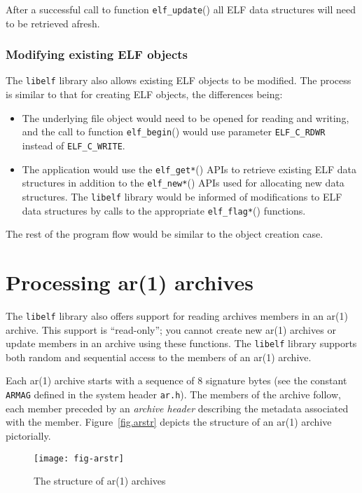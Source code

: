 \documentclass[a4paper]{book}
\newcommand{\constant}[1]{\texttt{#1}}
\newcommand{\function}[1]{\texttt{#1}()}
\newcommand{\filename}[1]{\texttt{#1}}
\newcommand{\firstterm}[1]{\textit{#1}}                 %
\newcommand{\library}[1]{\texttt{#1}}
\begin{document}
After a successful call to function \function{elf\_update} all ELF
data structures will need to be retrieved afresh.

\subsection{Modifying existing ELF objects}\label{sec.modifying-elf}

The \library{libelf} library also allows existing ELF objects to be
modified.  The process is similar to that for creating ELF objects,
the differences being:
\begin{itemize}
\item The underlying file object would need to be opened for reading
  and writing, and the call to function \function{elf\_begin} would
  use parameter \constant{ELF\_C\_RDWR} instead of
  \constant{ELF\_C\_WRITE}.
\item The application would use the \function{elf\_get*} APIs to
  retrieve existing ELF data structures in addition to the
  \function{elf\_new*} APIs used for allocating new data structures.
  The \library{libelf} library would be informed of modifications to
  ELF data structures by calls to the appropriate
  \function{elf\_flag*} functions.
\end{itemize}

The rest of the program flow would be similar to the object creation
case.

\chapter{Processing ar(1) archives}\label{chap.ar}
The \library{libelf} library also offers support for reading archives
members in an ar(1) archive.  This support is ``read-only''; you
cannot create new ar(1) archives or update members in an archive using
these functions.  The \library{libelf} library supports both random
and sequential access to the members of an ar(1) archive.

Each ar(1) archive starts with a sequence of 8 signature bytes
(see the constant \constant{ARMAG} defined in the system header
\filename{ar.h}).  The members of the archive follow, each member
preceded by an \firstterm{archive header} describing the metadata
associated with the member.  Figure~\vref{fig.arstr} depicts the
structure of an ar(1) archive pictorially.

\begin{figure}
  \begin{center}
    \texttt{[image: fig-arstr]}
  \end{center}
  \caption{The structure of ar(1) archives}\label{fig.arstr}
\end{figure}
\end{document}
